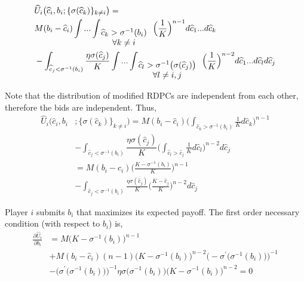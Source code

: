 \documentclass[journal,12pt, onecolumn]{IEEEtran}
\begin{document}
\vspace*{-3mm}
\begin{small}
\begin{align} 
&\widehat{U}_i \big(\widehat{c}_i , b_i ;\{\sigma(\widehat{c}_k)\}_{k \neq i}\big)=
\nonumber \\
& M(b_i - \widehat{c}_i) \int ...\int _ { \begin{array}{c}
\widehat{c}_k>\sigma ^{-1}(b_i) \\
\forall k \neq i \end{array}} \Big( \frac{1}{K}\Big)^{n-1} d\widehat{c}_1 ...d\widehat{c}_k \hspace{2mm} 
\nonumber
\\ &-\int_{
\widehat{c}_j<\sigma ^{-1}(b_i)}
\frac{\eta\sigma (\widehat{c}_j) }{K}\int ...\int _ {\begin{array}{c}
\widehat{c}_l>\sigma^{-1}\big(\sigma(\widehat{c}_j)\big)\\
\forall l \neq i,j  \end{array}} \Big(\frac{1}{K}\Big) ^{n-2} d\widehat{c}_1 ...d\widehat{c}_l d\widehat{c}_j 
\nonumber
\end{align}
\end{small}

Note that the distribution of modified RDPCs are independent from each other, therefore the bids are independent. Thus,
\begin{align} 
\widehat{U}_i \big(\widehat{c}_i , b_i &;\{\sigma(\widehat{c}_k)\}_{k \neq i}\big)
=
M(b_i - \widehat{c}_i) \Big(\int_ {\widehat{c}_k>\sigma ^{-1}(b_i)}\frac{1}{K}d\widehat{c}_k \Big) ^{n-1}
\nonumber \\
& -\int_{\widehat{c}_j<\sigma ^{-1}(b_i)}\dfrac{\eta\sigma (\widehat{c}_j) }{K} \Big( \int _ {\widehat{c}_l>\widehat{c}_j} \frac{1}{K} d\widehat{c}_l \Big) ^{n-2}d\widehat{c}_j
\nonumber  \\ 
 &=  M(b_i - \widehat{c}_i) \Big( \frac{K - \sigma ^{-1}(b_i)}{K}\Big) ^{n-1} 
\nonumber \\
& -\int_{\widehat{c}_j<\sigma ^{-1}(b_i)}\frac{\eta\sigma (\widehat{c}_j) }{K}\Big( \frac{K- \widehat{c}_j}{K}\Big) ^{n-2}d\widehat{c}_j 
\end{align}

Player $i$ submits $b_i$ that maximizes its expected payoff. The first order necessary condition (with respect to $b_i$) is,
\begin{align} 
\frac{\partial{\widehat{U}_i}}{\partial b_i} &= M\big(K - \sigma ^{-1}(b_i)\big) ^{n-1} 
\nonumber \\ 
&
+ M(b_i - \widehat{c}_i)(n-1)\big(K - \sigma ^{-1}(b_i)\big)^{n-2}\Big(-\sigma ^{'}\big(\sigma^{-1}(b_i) \big)\Big)^{-1}
\nonumber \\ 
&- \Big(\sigma ^{'}\big(\sigma^{-1}(b_i) \big)\Big)^{-1} \eta\sigma \big(\sigma^{-1} (b_i)\big)\big(K- \sigma^{-1} (b_i)\big)^{n-2}=0
\nonumber
\end{align}
\end{document}
